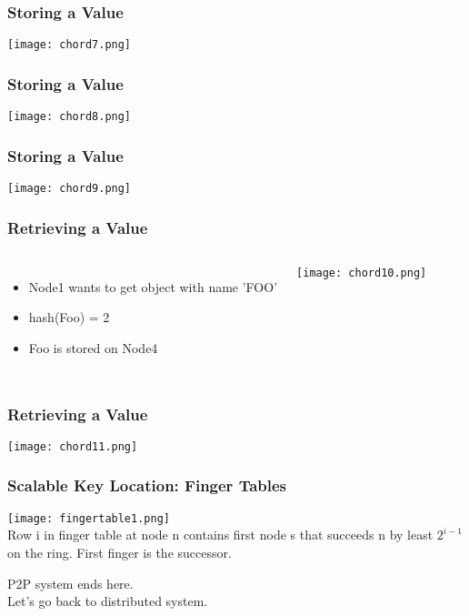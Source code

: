 \begin{frame}
    \frametitle{Storing a Value}
    \texttt{[image: chord7.png]}
\end{frame}

\begin{frame}
    \frametitle{Storing a Value}
    \texttt{[image: chord8.png]}
\end{frame}

\begin{frame}
    \frametitle{Storing a Value}
    \texttt{[image: chord9.png]}
\end{frame}

\begin{frame}
    \frametitle{Retrieving a Value}
    \begin{columns}
        \begin{itemize}
            \item Node1 wants to get object with name 'FOO'
            \item hash(Foo) = 2
            \item Foo is stored on Node4
        \end{itemize}
            \texttt{[image: chord10.png]}
    \end{columns}
\end{frame}

\begin{frame}
    \frametitle{Retrieving a Value}
    \texttt{[image: chord11.png]}
\end{frame}

\begin{frame}
    \frametitle{Scalable Key Location: Finger Tables}
    \texttt{[image: fingertable1.png]} \\
    Row i in finger table at node n contains first node s that succeeds n by least $2^{i-1}$ on the ring. First finger is the successor.
\end{frame}

\begin{frame}
    P2P system ends here. \\
    Let's go back to distributed system.
\end{frame}
